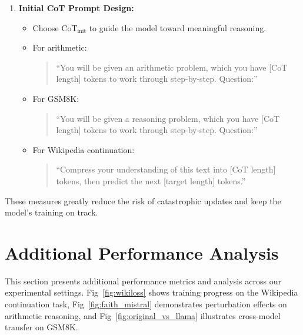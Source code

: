 \documentclass{article} %
\begin{document}
\begin{enumerate}
    \item \textbf{Initial CoT Prompt Design:} 
    \begin{itemize}
        \item Choose $\text{CoT}_{\text{init}}$ to guide the model toward meaningful reasoning. 
        \item For arithmetic: 
        \begin{quote}
            \small
            ``You will be given an arithmetic problem, which you have [CoT length] tokens to work through step-by-step. Question:''
        \end{quote}
        \item For GSM8K:
        \begin{quote}
            \small
            ``You will be given a reasoning problem, which you have [CoT length] tokens to work through step-by-step. Question:''
        \end{quote}
        \item For Wikipedia continuation:
        \begin{quote}
            \small
            ``Compress your understanding of this text into [CoT length] tokens, then predict the next [target length] tokens.''
        \end{quote}
    \end{itemize}
\end{enumerate}

These measures greatly reduce the risk of catastrophic updates and keep the model's training on track.

\section{Additional Performance Analysis}
\label{app:additional_figures}
This section presents additional performance metrics and analysis across our experimental settings. Fig~\ref{fig:wikiloss} shows training progress on the Wikipedia continuation task, Fig~\ref{fig:faith_mistral} demonstrates perturbation effects on arithmetic reasoning, and Fig~\ref{fig:original_vs_llama} illustrates cross-model transfer on GSM8K.
\end{document}
